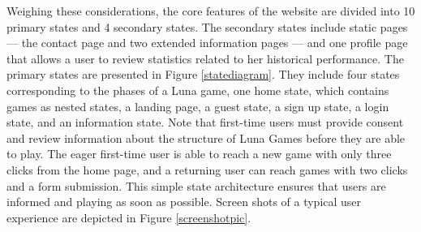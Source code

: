 Weighing these considerations, the core features of the website are divided into 10 primary states and 4 secondary states. The secondary states include static pages --- the contact page and two extended information pages --- and one profile page that allows a user to review statistics related to her historical performance. The primary states are presented in Figure \ref{statediagram}. They include four states corresponding to the phases of a Luna game, one home state, which contains games as nested states, a landing page, a guest state, a sign up state, a login state, and an information state. Note that first-time users must provide consent and review information about the structure of Luna Games before they are able to play. The eager first-time user is able to reach a new game with only three clicks from the home page, and a returning user can reach games with two clicks and a form submission. This simple state architecture ensures that users are informed and playing as soon as possible. Screen shots of a typical user experience are depicted in Figure \ref{screenshotpic}.

